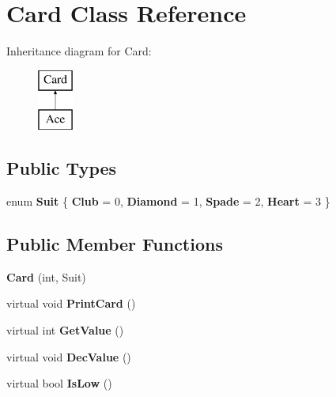 \hypertarget{class_card}{}\section{Card Class Reference}
\label{class_card}
Inheritance diagram for Card\+:\begin{figure}[H]
\begin{center}
\leavevmode
\includegraphics[height=2.000000cm]{class_card}
\end{center}
\end{figure}
\subsection*{Public Types}
\begin{DoxyCompactItemize}
\item 
enum {\bfseries Suit} \{ {\bfseries Club} = 0, 
{\bfseries Diamond} = 1, 
{\bfseries Spade} = 2, 
{\bfseries Heart} = 3
 \}\hypertarget{class_card_a5725a8e05afab8cd2f555bd81b069860}{}\label{class_card_a5725a8e05afab8cd2f555bd81b069860}

\end{DoxyCompactItemize}
\subsection*{Public Member Functions}
\begin{DoxyCompactItemize}
\item 
{\bfseries Card} (int, Suit)\hypertarget{class_card_aa403413f072507d2b985ab0a89d58ec5}{}\label{class_card_aa403413f072507d2b985ab0a89d58ec5}

\item 
virtual void {\bfseries Print\+Card} ()\hypertarget{class_card_af8d609d9fcbd761b9cf745bbbd3b709a}{}\label{class_card_af8d609d9fcbd761b9cf745bbbd3b709a}

\item 
virtual int {\bfseries Get\+Value} ()\hypertarget{class_card_ac1b08be5c93e652100bc993ce91c988d}{}\label{class_card_ac1b08be5c93e652100bc993ce91c988d}

\item 
virtual void {\bfseries Dec\+Value} ()\hypertarget{class_card_a72046d7f7bc4a33b69f9eb0bb154fa70}{}\label{class_card_a72046d7f7bc4a33b69f9eb0bb154fa70}

\item 
virtual bool {\bfseries Is\+Low} ()\hypertarget{class_card_ade427b5133fd8815fd0d5dcd0d097c84}{}\label{class_card_ade427b5133fd8815fd0d5dcd0d097c84}

\end{DoxyCompactItemize}
